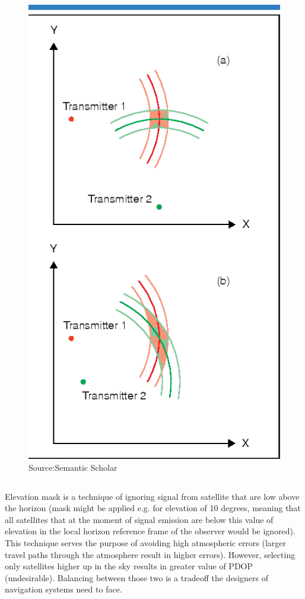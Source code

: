 \begin{figure}[H]
		\centering
		\includegraphics[width=0.6\linewidth]{pdop.png}
		\caption*{Source:Semantic Scholar}
\end{figure}


\subsection{}
Elevation mask is a technique of ignoring signal from satellite that are low above the horizon (mask might be applied e.g. for elevation of 10 degrees, meaning that all satellites that at the moment of signal emission are below this value of elevation in the local horizon reference frame of the observer would be ignored). This technique serves the purpose of avoiding high atmospheric errors (larger travel paths through the atmosphere result in higher errors). However, selecting only satellites higher up in the sky results in greater value of PDOP (undesirable). Balancing between those two is a tradeoff the designers of navigation systems need to face.
	
